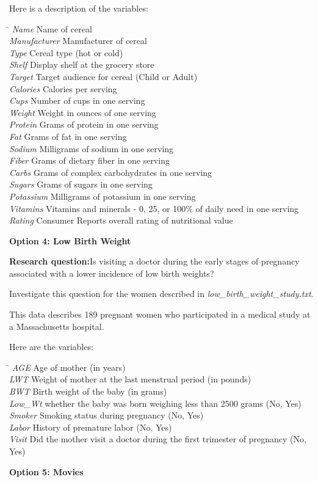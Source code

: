 Here is a description of the variables: 
\begin{tabbing}
\hspace*{1.2in}\=\kill
\emph{Name}\>  Name of cereal \\
\emph{Manufacturer}\>  Manufacturer of cereal\\
\emph{Type}\>  Cereal type (hot or cold)\\
\emph{Shelf}\>  Display shelf at the grocery store\\
\emph{Target}\> Target audience for cereal (Child or Adult)\\
\emph{Calories}\>  Calories per serving\\
\emph{Cups}\>  Number of cups in one serving\\
\emph{Weight}\>  Weight in ounces of one serving\\
\emph{Protein}\>  Grams of protein in one serving\\
\emph{Fat}\>  Grams of fat in one serving\\
\emph{Sodium}\>  Milligrams of sodium in one serving\\
\emph{Fiber}\>  Grams of dietary fiber in one serving\\
\emph{Carbs}\>  Grams of complex carbohydrates in one serving\\
\emph{Sugars}\>  Grams of sugars in one serving\\
\emph{Potassium}\>  Milligrams of potassium in one serving\\
\emph{Vitamins}\>  Vitamins and minerals - 0, 25, or 100\% of daily need in one serving\\
\emph{Rating}\>  Consumer Reports overall rating of nutritional value  
\end{tabbing}

\newpage
\textbf{Option 4: Low Birth Weight} 

\textbf{Research question:}Is visiting a doctor during the early stages of pregnancy associated with a lower incidence of low birth weights? 

Investigate this question for the women described in \emph{low\_birth\_weight\_study.txt}. 

This data describes 189 pregnant women who participated in a medical study at a Massachusetts hospital.

Here are the variables:
\begin{tabbing}
\hspace*{1in}\=\kill
\emph{AGE} \> Age of mother (in years)\\
\emph{LWT} \> Weight of mother at the last menstrual period (in pounds)\\
\emph{BWT} \> Birth weight of the baby (in grams)\\
\emph{Low\_Wt} \> whether the baby was born weighing less than 2500 grams (No, Yes)\\
\emph{Smoker} \> Smoking status during pregnancy (No, Yes)\\
\emph{Labor} \> History of premature labor (No, Yes)\\
\emph{Visit} \> Did the mother visit a doctor during the first trimester of pregnancy (No, Yes)
\end{tabbing}
\textbf{Option 5: Movies}



